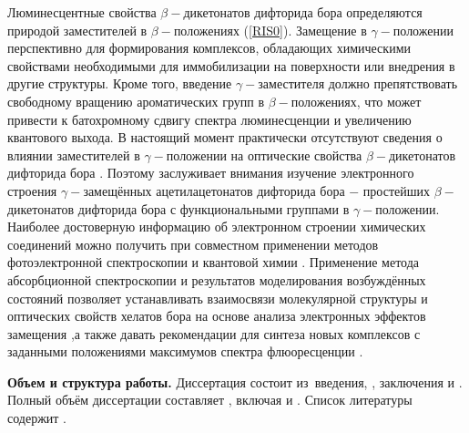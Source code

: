 Люминесцентные свойства $\beta-$дикетонатов дифторида бора определяются природой заместителей в $\beta-$положениях
(\ref{RIS0}). Замещение в $\gamma-$положении перспективно для формирования комплексов, обладающих химическими 
свойствами необходимыми для иммобилизации на поверхности или внедрения в другие структуры. Кроме того, введение
$\gamma-$заместителя должно препятствовать свободному вращению ароматических групп в $\beta-$положениях, что 
может привести к батохромному сдвигу спектра люминесценции и увеличению квантового выхода.
В настоящий момент практически отсутствуют сведения о влиянии заместителей в $\gamma-$положении на оптические 
свойства $\beta-$дикетонатов дифторида бора \cite{svistunova2008alpha,tikhonov2018electronic}.
Поэтому заслуживает внимания изучение электронного строения $\gamma-$замещённых ацетилацетонатов дифторида бора 
$-$ простейших $\beta-$дикетонатов дифторида бора с функциональными группами в $\gamma-$положении.
Наиболее достоверную информацию об электронном строении химических соединений можно получить при совместном 
применении методов фотоэлектронной спектроскопии и квантовой химии \cite{nefedov1987elektronnaa,
nefedov1989elektronnaa,osmushko2016application}.
Применение метода абсорбционной спектроскопии и результатов моделирования возбуждённых состояний позволяет
устанавливать взаимосвязи молекулярной структуры и оптических свойств хелатов бора на основе анализа электронных
эффектов замещения \cite{karasev2006fotofizika,kazachek2015excited,margar2016fluorescent},а также давать
рекомендации для синтеза новых комплексов с заданными положениями максимумов спектра флюоресценции
\cite{ponce2018searching}.\\


\newcommand{\actuality}{}
\newcommand{\progress}{}
\newcommand{\aim}{{\textbf\aimTXT}}
\newcommand{\tasks}{\textbf{\tasksTXT}}
\newcommand{\novelty}{\textbf{\noveltyTXT}}
\newcommand{\influence}{\textbf{\influenceTXT}}
\newcommand{\methods}{\textbf{\methodsTXT}}
\newcommand{\defpositions}{\textbf{\defpositionsTXT}}
\newcommand{\reliability}{\textbf{\reliabilityTXT}}
\newcommand{\probation}{\textbf{\probationTXT}}
\newcommand{\contribution}{\textbf{\contributionTXT}}
\newcommand{\publications}{\textbf{\publicationsTXT}}


\textbf{Объем и структура работы.} Диссертация состоит из~введения,
,
заключения и
.
%
Полный объём диссертации составляет
, включая
 и
.
Список литературы содержит
.
